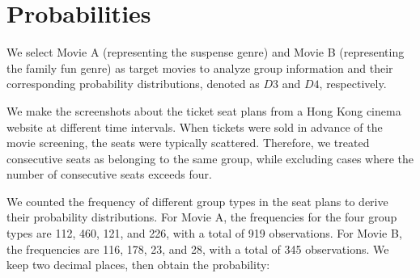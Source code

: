 \section{Probabilities}
We select Movie A (representing the suspense genre) and Movie B (representing the family fun genre) as target movies to analyze group information and their corresponding probability distributions, denoted as $D3$ and $D4$, respectively. 














We make the screenshots about the ticket seat plans from a Hong Kong cinema website at different time intervals. When tickets were sold in advance of the movie screening, the seats were typically scattered. Therefore, we treated consecutive seats as belonging to the same group, while excluding cases where the number of consecutive seats exceeds four. 

We counted the frequency of different group types in the seat plans to derive their probability distributions. For Movie A, the frequencies for the four group types are 112, 460, 121, and 226, with a total of 919 observations. For Movie B, the frequencies are 116, 178, 23, and 28, with a total of 345 observations. We keep two decimal places, then obtain the probability:

